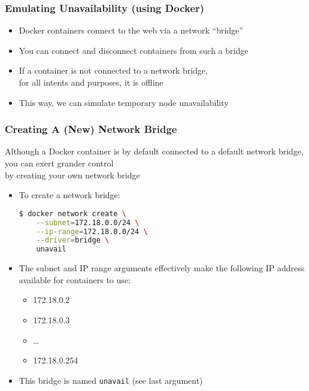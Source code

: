 \begin{frame}

\frametitle{Emulating Unavailability (using Docker)}

\begin{itemize}

\item Docker containers connect to the web via a network ``bridge''

\item You can connect and disconnect containers from such a bridge

\item If a container is not connected to a network bridge,\\ for all
intents and purposes, it is offline

\item This way, we can simulate temporary node unavailability

\end{itemize}

\end{frame}

\begin{frame}[fragile]

\frametitle{Creating A (New) Network Bridge}

\begin{center}

Although a Docker container is by default connected to a default
network bridge, you can exert grander control\\ by creating your own
network bridge

\end{center}

\begin{itemize}

\item To create a network bridge:

\begin{lstlisting}[language=bash]
$ docker network create \
    --subnet=172.18.0.0/24 \
    --ip-range=172.18.0.0/24 \
    --driver=bridge \
    unavail
\end{lstlisting}

\item The subnet and IP range arguments effectively make the following
IP address available for containers to use:

\begin{itemize}
\footnotesize

\item 172.18.0.2

\item 172.18.0.3

\item \ldots

\item 172.18.0.254

\end{itemize}

\item This bridge is named \texttt{unavail} (see last argument)

\end{itemize}

\end{frame}

